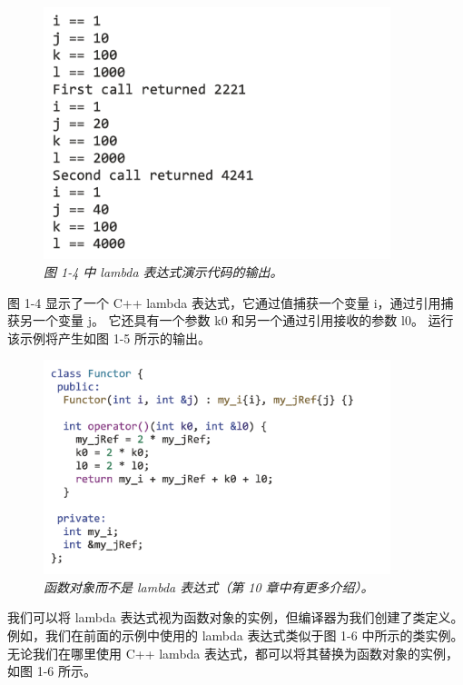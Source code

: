 \begin{figure}[H]
	\centering
	\includegraphics[width=0.9\textwidth]{figs/F1.5.png}
	\caption{\textit{图 1-4 中 lambda 表达式演示代码的输出。}}
\end{figure}

图 1-4 显示了一个 C++ lambda 表达式，它通过值捕获一个变量 i，通过引用捕获另一个变量 j。 
它还具有一个参数 k0 和另一个通过引用接收的参数 l0。 运行该示例将产生如图 1-5 所示的输出。

\begin{figure}[H]
	\centering
	\includegraphics[width=0.9\textwidth]{figs/F1.6.png}
	\caption{\textit{函数对象而不是 lambda 表达式（第 10 章中有更多介绍）。}}
\end{figure}

我们可以将 lambda 表达式视为函数对象的实例，但编译器为我们创建了类定义。 
例如，我们在前面的示例中使用的 lambda 表达式类似于图 1-6 中所示的类实例。 
无论我们在哪里使用 C++ lambda 表达式，都可以将其替换为函数对象的实例，如图 1-6 所示。

